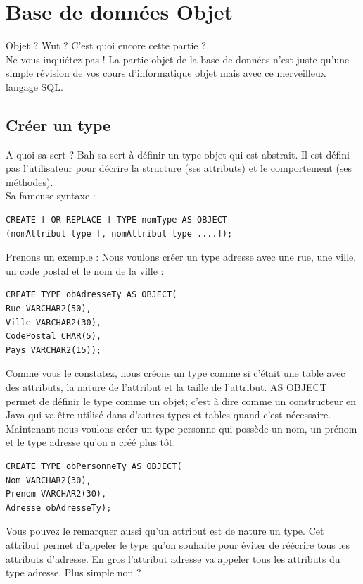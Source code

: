 \documentclass{report}
\begin{document}
\chapter{Base de données Objet}

Objet ? Wut ? C'est quoi encore cette partie ? \\
Ne vous inquiétez pas ! La partie objet de la base de données n'est juste qu'une simple révision de vos cours d'informatique objet mais avec ce merveilleux langage SQL. \\
\section{Créer un type}
A quoi sa sert ? Bah sa sert à définir un type objet qui est abstrait. Il est défini pas l'utilisateur pour décrire la structure (ses attributs) et le comportement (ses méthodes).\\
Sa fameuse syntaxe :
\begin{lstlisting}[style=MySQLStyle]
CREATE [ OR REPLACE ] TYPE nomType AS OBJECT
(nomAttribut type [, nomAttribut type ....]);
\end{lstlisting}

Prenons un exemple : Nous voulons créer un type adresse avec une rue, une ville, un code postal et le nom de la ville :
\begin{lstlisting}[style=MySQLStyle]
CREATE TYPE obAdresseTy AS OBJECT(
Rue VARCHAR2(50),
Ville VARCHAR2(30),
CodePostal CHAR(5),
Pays VARCHAR2(15));
\end{lstlisting}
Comme vous le constatez, nous créons un type comme si c'était une table avec des attributs, la nature de l'attribut et la taille de l'attribut. AS OBJECT permet de définir le type comme un objet; c'est à dire comme un constructeur en Java qui va être utilisé dans d'autres types et tables quand c'est nécessaire. \\

Maintenant nous voulons créer un type personne qui possède un nom, un prénom et le type adresse qu'on a créé plus tôt.
\begin{lstlisting}[style=MySQLStyle]
CREATE TYPE obPersonneTy AS OBJECT(
Nom VARCHAR2(30),
Prenom VARCHAR2(30),
Adresse obAdresseTy);
\end{lstlisting}
Vous pouvez le remarquer aussi qu'un attribut est de nature un type. Cet attribut permet d'appeler le type qu'on souhaite pour éviter de réécrire tous les attributs d'adresse. En gros l'attribut adresse va appeler tous les attributs du type adresse. Plus simple non ? \\
\end{document}
